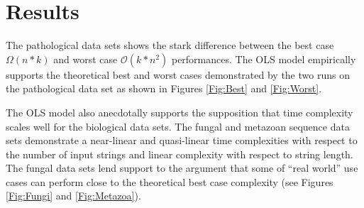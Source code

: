 \documentclass{bmcart}
\begin{document}
\section*{Results}

The pathological data sets shows the stark difference between the best case $\Omega(n * k)$ and worst case $\mathcal{O}(k * n^2)$ performances.
The OLS model empirically supports the theoretical best and worst cases demonstrated by the two runs on the pathological data set as shown in Figures \ref{Fig:Best} and \ref{Fig:Worst}.

The OLS model also anecdotally supports the supposition that time complexity scales well for the biological data sets.
The fungal and metazoan sequence data sets demonstrate a near-linear and quasi-linear time complexities with respect to the number of input strings and linear complexity with respect to string length.
The fungal data sets lend support to the argument that some of ``real world'' use cases can perform close to the theoretical best case complexity (see Figures \ref{Fig:Fungi} and \ref{Fig:Metazoa}).


\end{document}

